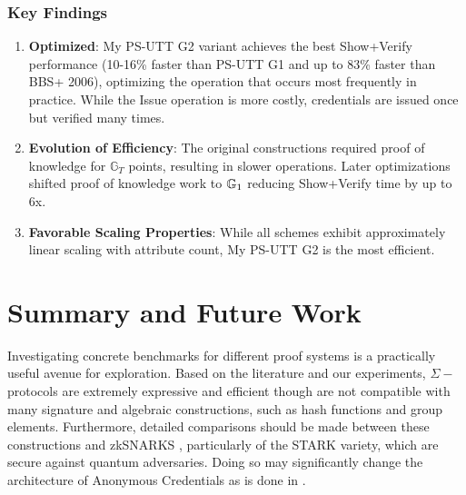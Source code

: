 \subsubsection{Key Findings}
\begin{enumerate}
    \item \textbf{Optimized}: My PS-UTT G2 variant achieves the best Show+Verify performance (10-16\% faster than PS-UTT G1 and up to 83\% faster than BBS+ 2006), optimizing the operation that occurs most frequently in practice. While the Issue operation is more costly, credentials are issued once but verified many times.
    
    \item \textbf{Evolution of Efficiency}: The original constructions \cite{hutchison_constant-size_2006, sako_short_2016} required proof of knowledge for $\mathbb{G}_T$ points, resulting in slower operations. Later optimizations \cite{camenisch_anonymous_2016, tomescu_utt_2022} shifted proof of knowledge work to $\mathbb{G}_1$ reducing Show+Verify time by up to 6x. 
    
    \item \textbf{Favorable Scaling Properties}: While all schemes exhibit approximately linear scaling with attribute count, My PS-UTT G2 is the most efficient.
\end{enumerate}




\section{Summary and Future Work}
Investigating concrete benchmarks for different proof systems is a practically useful avenue for exploration. Based on the literature and our experiments, $\Sigma-$protocols are extremely expressive and efficient though are not compatible with many signature and algebraic constructions, such as hash functions and group elements. 
Furthermore, detailed comparisons should be made between these constructions and zkSNARKS \cite{ben-sasson_snarks_2013}, particularly of the STARK \cite{ben-sasson_stark_2020} variety, which are secure against quantum adversaries. Doing so may significantly change the architecture of Anonymous Credentials as is done in \cite{rosenberg_zk-creds_2022}.






























